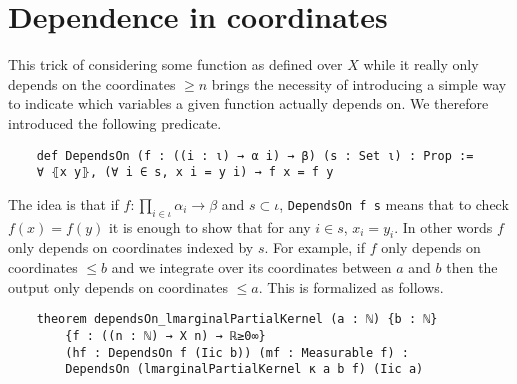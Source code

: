 \documentclass{article}
\newcommand{\A}{\mathcal{A}}
\newcommand{\R}{\mathbb{R}}
\newcommand{\dx}{\mathrm{d}x}
\newcommand{\dy}{\mathrm{d}y}
\newcommand{\dmu}{\mathrm{d}\mu}
\theoremstyle{definition}
\theoremstyle{remark}
\begin{document}

	\section{Dependence in coordinates}

	This trick of considering some function as defined over $X$ while it really only depends on the coordinates $\ge n$ brings the necessity of introducing a simple way to indicate which variables a given function actually depends on. We therefore introduced the following predicate.
	\begin{lstlisting}
	def DependsOn (f : ((i : ι) → α i) → β) (s : Set ι) : Prop :=
	∀ ⦃x y⦄, (∀ i ∈ s, x i = y i) → f x = f y
	\end{lstlisting}
	The idea is that if $f : \prod_{i\in\iota} \alpha_i \to \beta$ and $s \subset \iota$, \texttt{DependsOn f s} means that to check $f(x) = f(y)$ it is enough to show that for any $i \in s$, $x_i = y_i$. In other words $f$ only depends on coordinates indexed by $s$. For example, if $f$ only depends on coordinates $\le b$ and we integrate over its coordinates between $a$ and $b$ then the output only depends on coordinates $\le a$. This is formalized as follows.
	\begin{lstlisting}
	theorem dependsOn_lmarginalPartialKernel (a : ℕ) {b : ℕ}
		{f : ((n : ℕ) → X n) → ℝ≥0∞}
		(hf : DependsOn f (Iic b)) (mf : Measurable f) :
		DependsOn (lmarginalPartialKernel κ a b f) (Iic a)
	\end{lstlisting}
\end{document}
